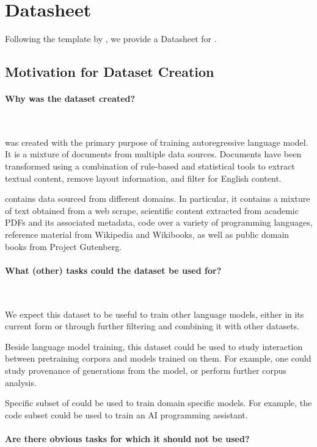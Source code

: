 
\section{Datasheet}
\label{sec:datasheet}

Following the template by \citet{gebru2021datasheets}, we provide a Datasheet for \dolma.


\subsection{Motivation for Dataset Creation}

\paragraph{Why was the dataset created?}~ 

\dolma was created with the primary purpose of training \olmo autoregressive language model. It is a mixture of documents from multiple data sources. Documents have been transformed using a combination of rule-based and statistical tools to extract textual content, remove layout information, and filter for English content. 

\dolma contains data sourced from different domains. In particular, it contains a mixture of text obtained from a web scrape, scientific content extracted from academic PDFs and its associated metadata, code over a variety of programming languages, reference material from Wikipedia and Wikibooks, as well as public domain books from Project Gutenberg.

\paragraph{What (other) tasks could the dataset be used for?}~

We expect this dataset to be useful to train other language models, either in its current form or through further filtering and combining it with other datasets. 

Beside language model training, this dataset could be used to study interaction between pretraining corpora and models trained on them. For example, one could study provenance of generations from the model, or perform further corpus analysis. 

Specific subset of \dolma could be used to train domain specific models. For example, the code subset could be used to train an AI programming assistant. 

\paragraph{Are there obvious tasks for which it should not be used?}~


